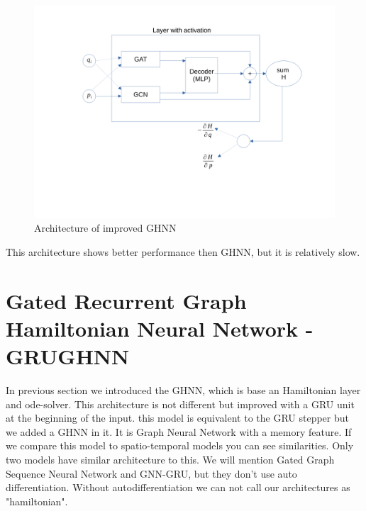 \begin{figure}[h!]
	\includegraphics[width=15cm]{chapters/chapter4/improved_GHNN.pdf}
	
	\caption{Architecture of improved GHNN}
	\label{improvedGHNN}
\end{figure}
This architecture shows better performance then GHNN, but it is relatively slow. 
 

 



\section{Gated Recurrent Graph Hamiltonian Neural Network - GRUGHNN}
In previous section we introduced the GHNN, which is base an Hamiltonian layer and ode-solver. This architecture is not different but improved with a GRU unit at the beginning of the input. this model is equivalent to the GRU stepper but we added a GHNN in it. It is Graph Neural Network with a memory feature. If we compare this model to spatio-temporal models you can see similarities. Only two models have similar architecture to this. We will mention Gated Graph Sequence Neural Network\cite{GGSNN} and GNN-GRU\cite{gnngru}, but they don't use auto differentiation. Without autodifferentiation we can not call our architectures as "hamiltonian". 

